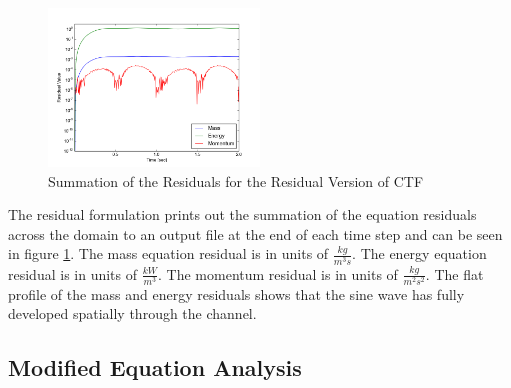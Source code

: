 \documentclass{mc2015}
\begin{document}
\begin{figure}[!h]
	\centering
	\includegraphics[width=0.50\textwidth]{images/Code_Verification/run_00_00/residual/results/Residuals_Plot}
	\caption{Summation of the Residuals for the Residual Version of CTF}
	\label{fig:Residuals_Plot}
\end{figure}

The residual formulation prints out the summation of the equation residuals
across the domain to an output file at the end of each time step and can be seen
in figure \ref{fig:Residuals_Plot}. The mass equation residual is in units of
$\frac{kg}{m^{3}s}$. The energy equation residual is in units of
$\frac{kW}{m^{3}}$. The momentum residual is in units of
$\frac{kg}{m^{2}s^{2}}$. The flat profile of the mass and energy residuals shows
that the sine wave has fully developed spatially through the channel.

%
%

\subsection{Modified Equation Analysis}
    
\end{document}
